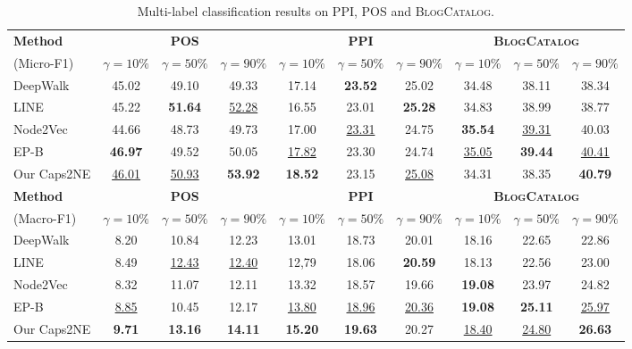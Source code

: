 \documentclass[sigconf]{acmart}
\begin{document}
\begin{table*}
\centering
\caption{Multi-label classification results on PPI, POS and \textsc{BlogCatalog}.}
\def\arraystretch{1.2}
\begin{tabular}{l|ccc|ccc|ccc}
\hline
\bf Method & \multicolumn{3}{c|}{\bf POS} & \multicolumn{3}{c|}{\bf PPI} & \multicolumn{3}{c}{\bf \textsc{BlogCatalog}}\\
\cline{2-10}
(Micro-F1) & $\gamma=10\%$ & $\gamma=50\%$ & $\gamma=90\%$ & $\gamma=10\%$ & $\gamma=50\%$ & $\gamma=90\%$ & $\gamma=10\%$ & $\gamma=50\%$ & $\gamma=90\%$\\
\hline
DeepWalk &  45.02 &  49.10 &  49.33  & 17.14   & \textbf{23.52}  & 25.02  & 34.48   & 38.11   & 38.34 \\
LINE  & 45.22  & \textbf{51.64}  & \underline{52.28}  & 16.55   & 23.01   & \textbf{25.28} & 34.83   & 38.99   & 38.77 \\
Node2Vec  & 44.66   & 48.73   & 49.73   & 17.00  & \underline{23.31} & 24.75  & \textbf{35.54}   & \underline{39.31}  & 40.03 \\
EP-B  & \textbf{46.97}  &  49.52   & 50.05   & \underline{17.82} & 23.30  &  24.74  & \underline{35.05}   & \textbf{39.44}  & \underline{40.41}\\
\hline
Our Caps2NE  & \underline{46.01} & \underline{50.93} & \textbf{53.92} & \textbf{18.52} & 23.15  & \underline{25.08} & 34.31  & 38.35  & \textbf{40.79}\\
\hline
\hline
{\bf Method}& \multicolumn{3}{c|}{\bf POS} & \multicolumn{3}{c|}{\bf PPI}  &\multicolumn{3}{c}{\bf \textsc{BlogCatalog}}\\
\cline{2-10}
(Macro-F1) & $\gamma=10\%$ & $\gamma=50\%$ & $\gamma=90\%$ & $\gamma=10\%$ & $\gamma=50\%$ & $\gamma=90\%$ & $\gamma=10\%$ & $\gamma=50\%$ & $\gamma=90\%$\\
\hline
DeepWalk & 8.20   & 10.84   & 12.23  & 13.01  &  18.73  & 20.01  & 18.16  &  22.65   & 22.86 \\
LINE & 8.49   & \underline{12.43}  & \underline{12.40}  & 12,79   & 18.06  &  \textbf{20.59} & 18.13   & 22.56  &  23.00 \\
Node2Vec & 8.32  &  11.07   & 12.11  &  13.32   & 18.57   & 19.66  & \textbf{19.08}  & 23.97   & 24.82 \\
EP-B & \underline{8.85} & 10.45   & 12.17  &  \underline{13.80} & \underline{18.96} & \underline{20.36} & \textbf{19.08}  &  \textbf{25.11}  & \underline{25.97} \\
\hline
Our Caps2NE & \textbf{9.71} & \textbf{13.16} & \textbf{14.11} & \textbf{15.20} & \textbf{19.63} & 20.27  & \underline{18.40}   & \underline{24.80} & \textbf{26.63}\\
\hline
\end{tabular}
\label{tab:posppi}
\end{table*}
\end{document}
